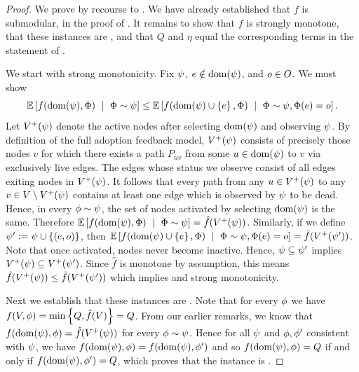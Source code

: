 \newcommand{\activenodes}[1]{\ensuremath{V^{+}\!\paren{#1} }}
\begin{proof}
 We prove  by recourse to 
.
We have already established that $f$ is \term submodular, in the proof
of .  It remains to show that $f$ is
strongly \term monotone, that these instances are \certifying, and
that $Q$ and $\eta$ equal the corresponding terms 
in the statement of .


We start with strong \term monotonicity.  Fix ${\color{black}{\ensuremath{\psi}}}$,  $e
\notin \operatorname{dom}({\color{black}{\ensuremath{\psi}}})$, and $o \in O$.  We must show 
\begin{equation}
  \label{eq:viral-min-cost1}
  \expctoverrlz{\rvrlz}{f(\dom(\prlz), \rvrlz) \ \mid \ \rvrlz \sim \prlz} \le 
\expctoverrlz{\rvrlz}{f(\dom(\prlz) \cup \set{\elem}, \rvrlz) \ \mid \ \rvrlz \sim
  \prlz, \rvrlz(\elem) = \outcome}.
\end{equation}
Let  $\activenodes{\prlz}$ denote the active nodes after selecting 
$\operatorname{dom}({\color{black}{\ensuremath{\psi}}})$ and observing ${\color{black}{\ensuremath{\psi}}}$.
By definition of the full adoption feedback model,
$\activenodes{\prlz}$ consists of precisely
those nodes $v$ for which there exists a path $P_{uv}$ from some $u \in
\operatorname{dom}({\color{black}{\ensuremath{\psi}}})$ to $v$ via exclusively live edges.  The edges whose
status we observe consist of all edges exiting nodes in
$\activenodes{\prlz}$.  
%
It follows that every path
from any $u \in \activenodes{\prlz}$ to any $v \in V \setminus
\activenodes{\prlz}$ contains at least one edge which is observed by
${\color{black}{\ensuremath{\psi}}}$ to
be dead.
Hence, in every ${\color{black}{\ensuremath{\phi}}} \sim {\color{black}{\ensuremath{\psi}}}$, the set of nodes activated by
selecting $\operatorname{dom}({\color{black}{\ensuremath{\psi}}})$ is the same.
Therefore $\expctoverrlz{\rvrlz}{f(\dom(\prlz), \rvrlz) \ \mid \ \rvrlz \sim
  \prlz} = \hat{f}(\activenodes{\prlz})$.
Similarly, if we define ${\color{black}{\ensuremath{\psi}}}' := {\color{black}{\ensuremath{\psi}}} \cup \left\{(e,
  o)\right\}$, then 
$\expctoverrlz{\rvrlz}{f(\dom(\prlz) \cup \set{\elem}, \rvrlz) \ \mid \ \rvrlz \sim
  \prlz, \rvrlz(\elem) = \outcome} = \hat{f}(\activenodes{\prlz'})$.
Note that once activated, nodes never become inactive.
Hence, ${\color{black}{\ensuremath{\psi}}} \subseteq {\color{black}{\ensuremath{\psi}}}'$ implies 
$\activenodes{\prlz} \subseteq \activenodes{\prlz'}$.
Since $\hat{f}$ is monotone by assumption, this means 
$\hat{f}(\activenodes{\prlz}) \le \hat{f}(\activenodes{\prlz'})$
which implies  and strong \term monotonicity.


Next we establish that these instances are \certifying.
Note that for every ${\color{black}{\ensuremath{\phi}}}$ we have 
$f(V, {\color{black}{\ensuremath{\phi}}}) = \min \left\{Q, \hat{f}(V)\right\} = Q$.
From our earlier remarks, we know that 
$f(\dom(\prlz), \rlz) = \hat{f}(\activenodes{\prlz})$ for every ${\color{black}{\ensuremath{\phi}}}
\sim {\color{black}{\ensuremath{\psi}}}$.
Hence for all ${\color{black}{\ensuremath{\psi}}}$ and ${\color{black}{\ensuremath{\phi}}}, {\color{black}{\ensuremath{\phi}}}'$ consistent with ${\color{black}{\ensuremath{\psi}}}$, we
have $f(\operatorname{dom}({\color{black}{\ensuremath{\psi}}}), {\color{black}{\ensuremath{\phi}}}) = f(\operatorname{dom}({\color{black}{\ensuremath{\psi}}}), {\color{black}{\ensuremath{\phi}}}')$ and so 
$f(\operatorname{dom}({\color{black}{\ensuremath{\psi}}}), {\color{black}{\ensuremath{\phi}}}) = Q$ if and only if $f(\operatorname{dom}({\color{black}{\ensuremath{\psi}}}), {\color{black}{\ensuremath{\phi}}}') = Q$,
which proves that the instance is \certifying.



\end{proof}
